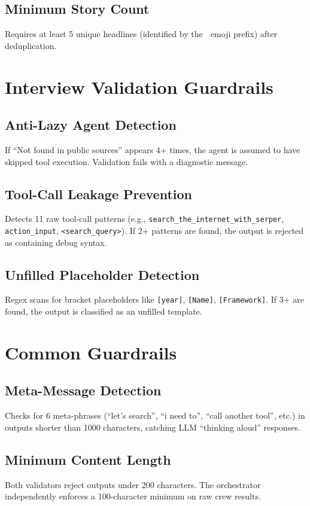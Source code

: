 \documentclass[12pt,a4paper]{report}
\begin{document}
\subsection{Minimum Story Count}
Requires at least 5 unique headlines (identified by the 📰 emoji prefix) after deduplication.

\section{Interview Validation Guardrails}

\subsection{Anti-Lazy Agent Detection}
If ``Not found in public sources'' appears 4+ times, the agent is assumed to have skipped tool execution. Validation fails with a diagnostic message.

\subsection{Tool-Call Leakage Prevention}
Detects 11 raw tool-call patterns (e.g., \texttt{search\_the\_internet\_with\_serper}, \texttt{action\_input}, \texttt{<search\_query>}). If 2+ patterns are found, the output is rejected as containing debug syntax.

\subsection{Unfilled Placeholder Detection}
Regex scans for bracket placeholders like \texttt{[year]}, \texttt{[Name]}, \texttt{[Framework]}. If 3+ are found, the output is classified as an unfilled template.

\section{Common Guardrails}

\subsection{Meta-Message Detection}
Checks for 6 meta-phrases (``let's search'', ``i need to'', ``call another tool'', etc.) in outputs shorter than 1000 characters, catching LLM ``thinking aloud'' responses.

\subsection{Minimum Content Length}
Both validators reject outputs under 200 characters. The orchestrator independently enforces a 100-character minimum on raw crew results.
\end{document}
